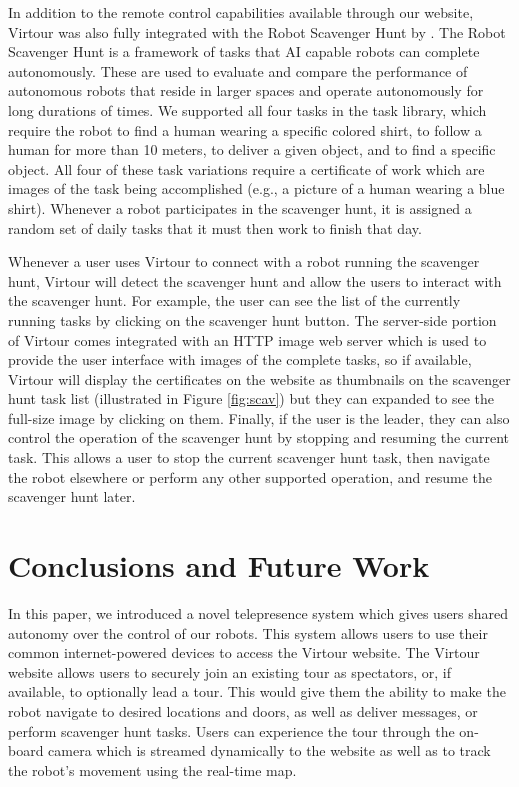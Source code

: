 \documentclass[
  oneside,
  11pt, a4paper,
  footinclude=true,
  headinclude=true,
  cleardoublepage=empty
]{article}
\begin{document}
In addition to the remote control capabilities available through our website,
Virtour was also fully integrated with the Robot Scavenger Hunt
by \citet{zhang2016}.  The Robot Scavenger Hunt is a framework of tasks that AI
capable robots can complete autonomously. These are used to
evaluate and compare the performance of autonomous robots that reside in larger
spaces and operate autonomously for long durations of times. We supported all
four tasks in the task library, which require the robot to find a human wearing
a specific colored shirt, to follow a human for more than 10 meters, to deliver
a given object, and to find a specific object. All four of these task
variations require a certificate of work which are images of the task being
accomplished (e.g., a picture of a human wearing a blue shirt). Whenever a
robot participates in the scavenger hunt, it is assigned a random set of daily
tasks that it must then work to finish that day.

Whenever a user uses Virtour to connect with a robot running the scavenger
hunt, Virtour will detect the scavenger hunt and allow the users to interact
with the scavenger hunt. For example, the user can see the list of the
currently running tasks by clicking on the scavenger hunt button. The
server-side portion of Virtour comes integrated with an HTTP image web server
which is used to provide the user interface with images of the complete tasks, 
so if available, Virtour will display the certificates on the website as
thumbnails on the scavenger hunt task list (illustrated in Figure
\ref{fig:scav}) but they can expanded to see the full-size image by clicking on
them. Finally, if the user is the leader, they can also control the operation
of the scavenger hunt by stopping and resuming the current task. This allows a
user to stop the current scavenger hunt task, then navigate the robot elsewhere
or perform any other supported operation, and resume the scavenger hunt later.

\section{Conclusions and Future Work}\label{sec:conclusion}

In this paper, we introduced a novel telepresence system which gives users
shared autonomy over the control of our robots. This system allows users to use
their common internet-powered devices to access the Virtour website. The
Virtour website allows users to securely join an existing tour as spectators,
or, if available, to optionally lead a tour. This would give them the ability
to make the robot navigate to desired locations and doors, as well as deliver
messages, or perform scavenger hunt tasks. Users can experience the tour
through the on-board camera which is streamed dynamically to the website as
well as to track the robot's movement using the real-time map.
\end{document}
